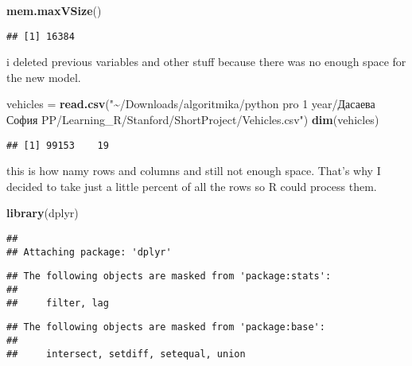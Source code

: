\documentclass[
]{article}
\newenvironment{Shaded}{\begin{snugshade}}{\end{snugshade}}
\newcommand{\AttributeTok}[1]{\textcolor[rgb]{0.13,0.29,0.53}{#1}}
\newcommand{\ConstantTok}[1]{\textcolor[rgb]{0.56,0.35,0.01}{#1}}
\newcommand{\FunctionTok}[1]{\textcolor[rgb]{0.13,0.29,0.53}{\textbf{#1}}}
\newcommand{\NormalTok}[1]{#1}
\newcommand{\OtherTok}[1]{\textcolor[rgb]{0.56,0.35,0.01}{#1}}
\newcommand{\SpecialCharTok}[1]{\textcolor[rgb]{0.81,0.36,0.00}{\textbf{#1}}}
\newcommand{\StringTok}[1]{\textcolor[rgb]{0.31,0.60,0.02}{#1}}
\begin{document}
\begin{Shaded}
\begin{Highlighting}[]
\FunctionTok{mem.maxVSize}\NormalTok{()}
\end{Highlighting}
\end{Shaded}

\begin{verbatim}
## [1] 16384
\end{verbatim}

i deleted previous variables and other stuff because there was no enough
space for the new model.

\begin{Shaded}
\begin{Highlighting}[]
\NormalTok{vehicles }\OtherTok{=} \FunctionTok{read.csv}\NormalTok{(}\StringTok{"\textasciitilde{}/Downloads/algoritmika/python pro 1 year/Дасаева София PP/Learning\_R/Stanford/ShortProject/Vehicles.csv"}\NormalTok{)}
\FunctionTok{dim}\NormalTok{(vehicles)}
\end{Highlighting}
\end{Shaded}

\begin{verbatim}
## [1] 99153    19
\end{verbatim}

this is how namy rows and columns and still not enough space. That's why
I decided to take just a little percent of all the rows so R could
process them.

\begin{Shaded}
\begin{Highlighting}[]
\FunctionTok{library}\NormalTok{(dplyr)}
\end{Highlighting}
\end{Shaded}

\begin{verbatim}
## 
## Attaching package: 'dplyr'
\end{verbatim}

\begin{verbatim}
## The following objects are masked from 'package:stats':
## 
##     filter, lag
\end{verbatim}

\begin{verbatim}
## The following objects are masked from 'package:base':
## 
##     intersect, setdiff, setequal, union
\end{verbatim}

\begin{Shaded}
\end{Shaded}
\end{document}
